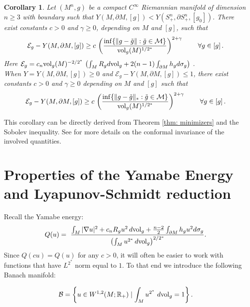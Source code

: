 \documentclass[12pt]{amsart}
\newtheorem{corollary}[theorem]{Corollary}
\newcommand{\R}{{\mathbb{R}}}
\newcommand{\g}{{\gamma}}
\newcommand{\M}{{\mathcal{M}}}
\newcommand{\na}{{\nabla}}
\newcommand{\B}{\mathcal{B}}
\newcommand{\vol}{{\rm{vol}}}
\begin{document}
 \begin{corollary}
 Let $(M^n,g)$ be a compact $C^\infty$ Riemannian manifold of dimension $n\geq 3$ with boundary such that $Y(M,\partial M,[g]) < Y(S^n_+,\partial S^n_+,[g_0]) $. There exist constants $c>0$ and  $\g\ge 0 $, depending on $M$ and $[g]$, such that 
 	\begin{equation}\label{e: minimizers conf invar}
 	\mathcal{E}_g  - Y(M,\partial M,[g]) \geq c\, \left(\frac{\inf\{ \| g - \tilde g\| : \tilde{g} \in \M \}}{\vol_g(M)^{1/2^*}}\right)^{2+\g}\, \qquad \forall g \in [g]\,.
 	\end{equation}
 	Here $\mathcal{E}_g= c_n \vol_g(M)^{-2/2^*}\,\left(\int_M R_{g} d\vol_g +2(n-1) \int_{\partial M} h_g d\sigma_g\right)  $ .\\
 When $Y= Y(M,\partial M,[g]) \geq 0$ and $\mathcal{E}_g  - Y(M,\partial M,[g])  \leq 1$, there exist constants $c>0$ and  $\g\ge 0 $ depending on $M$ and $[g]$ such that 
	\begin{equation}\label{e: minimizers conf invar2}
 	\mathcal{E}_g  - Y(M,\partial M,[g]) \geq c\, \left(\frac{\inf\{ \| g - \tilde g\|_* : \tilde{g} \in \M \}}{\vol_g(M)^{ 1/2^*}}\right)^{2+\g}\, \qquad \forall g \in [g]\,.
 	\end{equation}
 \end{corollary}
 This corollary can be directly derived from Theorem \ref{thm: minimizers} and the Sobolev inequality. See \cite{ENL22} for more details on the conformal invariance of the involved quantities.

    
\section{Properties of the Yamabe Energy and Lyapunov-Schmidt reduction}
    Recall the Yamabe energy:
    \begin{equation}
        Q(u) =
\ \frac{ \int_M  |\na u|^2 + c_nR_g u^2 \, d\vol_g+ \frac{n-2}{2}\int_{\partial M}h_g u^2 d \sigma_g}
  {\left(\int_M u^{2^*}\, d\vol_g\right)^{2/2^*}}.
    \end{equation}
Since $Q(cu ) = Q(u)$ for any $c >0$,  it will often be easier to work with functions that have $L^{2^*}$ norm equal to  $1$. To that end we introduce the following Banach manifold:

\begin{equation}\label{e:defofB}
 \B = \left\{u\in W^{1,2}(M ; \R_+) \mid \int_M u^{2^*}\ d\vol_g = 1\right\}.\end{equation}
\end{document}
